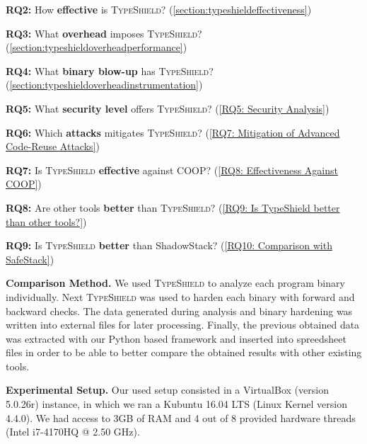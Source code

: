 \hspace{-.27cm}
\textbf{RQ2:} How \textbf{effective} is \textsc{TypeShield}? (\cref{section:typeshieldeffectiveness})

\hspace{-.27cm}
\textbf{RQ3:} What \textbf{overhead} imposes \textsc{TypeShield}? (\cref{section:typeshieldoverheadperformance})

\hspace{-.27cm}
\textbf{RQ4:} What \textbf{binary blow-up} has \textsc{TypeShield}? (\cref{section:typeshieldoverheadinstrumentation})

\hspace{-.27cm}
\textbf{RQ5:} What \textbf{security level} offers \textsc{TypeShield}? (\cref{RQ5: Security Analysis})


\hspace{-.27cm}
\textbf{RQ6:} Which \textbf{attacks} mitigates \textsc{TypeShield}? (\cref{RQ7: Mitigation of Advanced Code-Reuse Attacks})

\hspace{-.27cm}
\textbf{RQ7:} Is \textsc{TypeShield} \textbf{effective} against COOP? (\cref{RQ8: Effectiveness Against COOP})

\hspace{-.27cm}
\textbf{RQ8:} Are other tools \textbf{better} than \textsc{TypeShield}? (\cref{RQ9: Is TypeShield better than other tools?})

\hspace{-.27cm}
\textbf{RQ9:} Is \textsc{TypeShield} \textbf{better} than ShadowStack? (\cref{RQ10: Comparison with SafeStack})

\textbf{Comparison Method.} We used \textsc{TypeShield} to analyze each program binary individually. Next \textsc{TypeShield} was used to harden each binary with forward and 
backward checks. The data generated during analysis and binary hardening was written into external files for later processing. Finally, the previous obtained 
data was extracted with our Python based framework and inserted into spreedsheet files in order to be able to better compare the obtained 
results with other existing tools.

\textbf{Experimental Setup.} Our used setup consisted in a VirtualBox (version 5.0.26r) instance, in which we ran a Kubuntu 16.04 LTS (Linux Kernel
version 4.4.0). We had access to 3GB of RAM and 4 out of 8 provided hardware threads (Intel i7-4170HQ @ 2.50 GHz).

